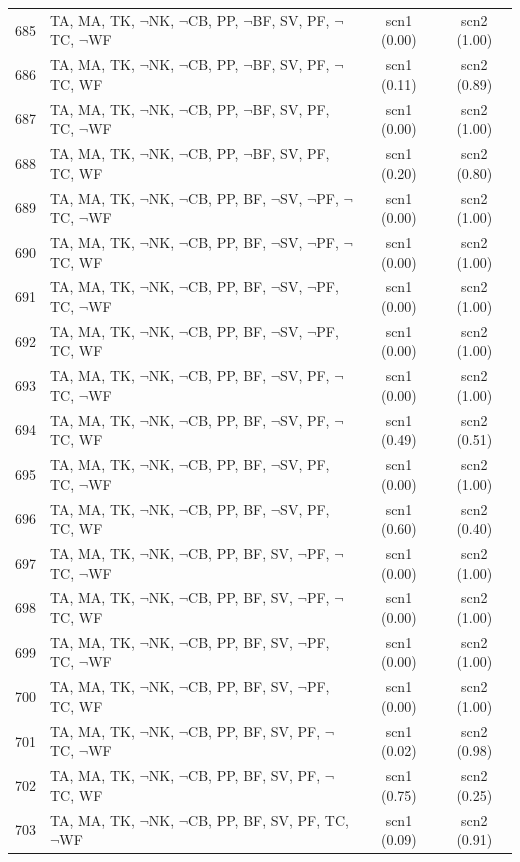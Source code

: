\documentclass[12pt]{article}
\begin{document}
\begin{longtable}{|l|l|c|c|}
685 & TA, MA, TK, $\neg$NK, $\neg$CB, PP, $\neg$BF, SV, PF, $\neg$TC, $\neg$WF & scn1 (0.00) & scn2 (1.00)\\
686 & TA, MA, TK, $\neg$NK, $\neg$CB, PP, $\neg$BF, SV, PF, $\neg$TC, WF & scn1 (0.11) & scn2 (0.89)\\
687 & TA, MA, TK, $\neg$NK, $\neg$CB, PP, $\neg$BF, SV, PF, TC, $\neg$WF & scn1 (0.00) & scn2 (1.00)\\
688 & TA, MA, TK, $\neg$NK, $\neg$CB, PP, $\neg$BF, SV, PF, TC, WF & scn1 (0.20) & scn2 (0.80)\\
689 & TA, MA, TK, $\neg$NK, $\neg$CB, PP, BF, $\neg$SV, $\neg$PF, $\neg$TC, $\neg$WF & scn1 (0.00) & scn2 (1.00)\\
690 & TA, MA, TK, $\neg$NK, $\neg$CB, PP, BF, $\neg$SV, $\neg$PF, $\neg$TC, WF & scn1 (0.00) & scn2 (1.00)\\
691 & TA, MA, TK, $\neg$NK, $\neg$CB, PP, BF, $\neg$SV, $\neg$PF, TC, $\neg$WF & scn1 (0.00) & scn2 (1.00)\\
692 & TA, MA, TK, $\neg$NK, $\neg$CB, PP, BF, $\neg$SV, $\neg$PF, TC, WF & scn1 (0.00) & scn2 (1.00)\\
693 & TA, MA, TK, $\neg$NK, $\neg$CB, PP, BF, $\neg$SV, PF, $\neg$TC, $\neg$WF & scn1 (0.00) & scn2 (1.00)\\
694 & TA, MA, TK, $\neg$NK, $\neg$CB, PP, BF, $\neg$SV, PF, $\neg$TC, WF & scn1 (0.49) & scn2 (0.51)\\
695 & TA, MA, TK, $\neg$NK, $\neg$CB, PP, BF, $\neg$SV, PF, TC, $\neg$WF & scn1 (0.00) & scn2 (1.00)\\
696 & TA, MA, TK, $\neg$NK, $\neg$CB, PP, BF, $\neg$SV, PF, TC, WF & scn1 (0.60) & scn2 (0.40)\\
697 & TA, MA, TK, $\neg$NK, $\neg$CB, PP, BF, SV, $\neg$PF, $\neg$TC, $\neg$WF & scn1 (0.00) & scn2 (1.00)\\
698 & TA, MA, TK, $\neg$NK, $\neg$CB, PP, BF, SV, $\neg$PF, $\neg$TC, WF & scn1 (0.00) & scn2 (1.00)\\
699 & TA, MA, TK, $\neg$NK, $\neg$CB, PP, BF, SV, $\neg$PF, TC, $\neg$WF & scn1 (0.00) & scn2 (1.00)\\
700 & TA, MA, TK, $\neg$NK, $\neg$CB, PP, BF, SV, $\neg$PF, TC, WF & scn1 (0.00) & scn2 (1.00)\\
701 & TA, MA, TK, $\neg$NK, $\neg$CB, PP, BF, SV, PF, $\neg$TC, $\neg$WF & scn1 (0.02) & scn2 (0.98)\\
702 & TA, MA, TK, $\neg$NK, $\neg$CB, PP, BF, SV, PF, $\neg$TC, WF & scn1 (0.75) & scn2 (0.25)\\
703 & TA, MA, TK, $\neg$NK, $\neg$CB, PP, BF, SV, PF, TC, $\neg$WF & scn1 (0.09) & scn2 (0.91)\\

\end{longtable}
\end{document}
